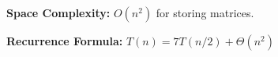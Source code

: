 \documentclass[a4paper,12pt]{article}
\begin{document}
\begin{tcolorbox}[
    colback=gray!30,
    colframe=black,
    boxrule=1pt,
    arc=0mm
]
\begin{tcolorbox}[
    colback=violet!20,
    colframe=black,
    arc=0mm
]
\small
\textbf{Space Complexity:}
$O(n^2)$ for storing matrices.
\end{tcolorbox}


\begin{tcolorbox}[
    colback=pink!20,
    colframe=black,
    arc=0mm
]
\small
\textbf{Recurrence Formula:}
$T(n)=7T(n/2)+\Theta(n^2)$
\end{tcolorbox}

\end{tcolorbox}
\end{document}
